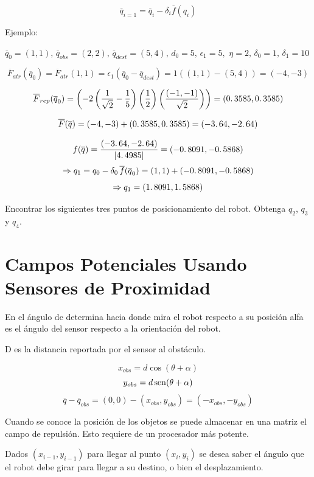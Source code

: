 $$\overline{q}_{i = 1} = \overline{q}_{i} - \delta_{i} \overline{f}(q_{i})$$

Ejemplo:


$\overline{q}_{0} = (1,1),\, \overline{q}_{obs} = (2,2),\, \overline{q}_{dest} = (5,4),\, d_{0} = 5,\, \epsilon_{1} = 5, \,\, \eta = 2,\, \delta_{0} = 1,\, \delta_{1} = 10$

$$\overline{F}_{atr}(\overline{q}_{0}) = \overline{F}_{atr}(1,1) = \epsilon_{1}(\overline{q}_{0} - \overline{q}_{dest}) = 1((1,1) - (5,4)) = (-4,-3)$$

$$\overline{F}_{rep}(\overline{q}_{0}) = \left( -2\left( \dfrac{1}{\sqrt{2}} - \dfrac{1}{5} \right) \left( \dfrac{1}{2} \right)  \left( \dfrac{(-1,-1)}{\sqrt{2}} \right) \right) = (0\ldotp3585,0\ldotp3585)$$

$$\overline{F}(\overline{q}) = (-4,-3) + (0\ldotp3585,0\ldotp3585) = (-3\ldotp64,-2\ldotp64)$$

$$f(\overline{q}) = \dfrac{(-3\ldotp64,-2\ldotp64)}{|4\ldotp4985|} = (-0\ldotp8091,-0\ldotp5868)$$
$$ \Rightarrow q_{1} = q_{0} - \delta_{0}\,\overline{f}(\overline{q}_{0}) = (1,1) + (-0\ldotp8091,-0\ldotp5868)$$
$$\Rightarrow q_{1} = (1\ldotp8091,1\ldotp5868)$$

Encontrar los siguientes tres puntos de posicionamiento del robot. Obtenga $q_{2}$, $q_{3}$ y $q_{4}$.


\section{Campos Potenciales Usando Sensores de Proximidad}


En el ángulo de determina hacia donde mira el robot respecto a su posición alfa es el ángulo del sensor respecto a la orientación del robot. 

D es la distancia reportada por el sensor al obstáculo. 

$$x_{obs} = d\cos (\theta + \alpha)$$
$$y_{obs} = d\mathop{\rm sen}\nolimits (\theta + \alpha)$$
$$\overline{q} - \overline{q}_{obs} = (0,0) - (x_{obs}, y_{obs}) = (-x_{obs}, -y_{obs})$$


Cuando se conoce la posición de los objetos se puede almacenar en una matriz el campo de repulsión. Esto requiere de un procesador más potente.


Dados $(x_{i - 1}, y_{i - 1})$ para llegar al punto $(x_{i}, y_{i})$ se desea saber el ángulo que el robot debe girar para llegar a su destino, o bien el desplazamiento.

